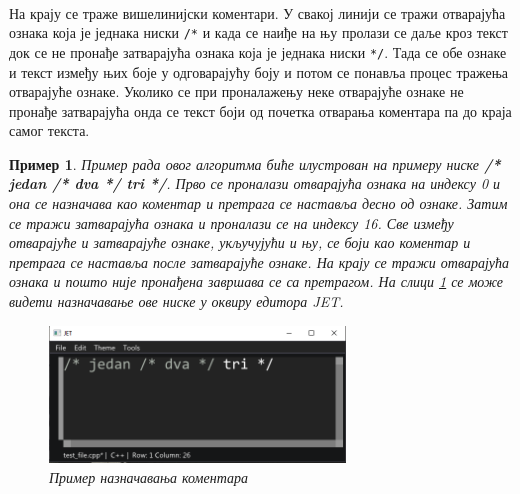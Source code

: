 \documentclass[12pt,oneside]{memoir}
\newtheorem{exmp}{Пример}
\begin{document}
\paragraph{}
На крају се траже вишелинијски коментари. У свакој линији се тражи отварајућа
ознака која је једнака ниски \verb|/*| и када се наиђе на њу пролази се даље
кроз текст док се не пронађе затварајућа ознака која је једнака ниски \verb|*/|.
Тада се обе ознаке и текст између њих боје у одговарајућу боју и потом се 
понавља процес тражења отварајуће ознаке. Уколико се при проналажењу
неке отварајуће ознаке не пронађе затварајућа онда се текст боји од почетка отварања коментара па до краја самог текста.

\begin{exmp}
Пример рада овог алгоритма биће илустрован на примеру ниске 
\textbf{/* jedan /* dva */ tri */}. Прво се проналази
отварајућа ознака на индексу 0 и она се назначава као коментар и претрага се наставља десно од ознаке. Затим се тражи затварајућа ознака и проналази се на индексу 16. Све између отварајуће и затварајуће ознаке, укључујући и њу, се боји као коментар и претрага се наставља после затварајуће ознаке. На крају се тражи отварајућа ознака и пошто није пронађена завршава се са претрагом. На слици \ref{fig:comment_example} се може видети назначавање ове ниске
у оквиру едитора \textit{JET}.

\begin{figure}
	\centering
	\includegraphics[width=0.7\textwidth]{images/comment_example.png}
	\caption{Пример назначавања коментара}
	\label{fig:comment_example}
\end{figure}
\end{exmp}
\end{document}
